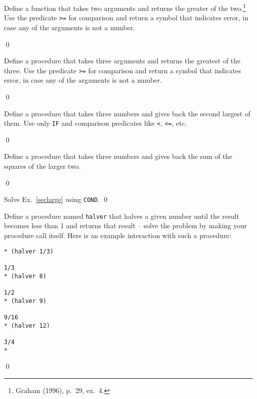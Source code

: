 \documentclass[a4paper,11pt]{article}
\begin{document}
\begin{uexercise}
Define a function that takes two arguments and returns the greater of the two.\footnote{Graham (1996), p.\ 29, ex.\ 4.} Use the predicate \Verb+>=+ for comparison and return a symbol that indicates error, in case any of the arguments is not a number.

\qed
\end{uexercise}

\begin{uexercise}
Define a procedure that takes three arguments and returns the greatest of the three.  Use the predicate \Verb+>=+ for comparison and return a symbol that indicates error, in case any of the arguments is not a number.

\qed
\end{uexercise}

\begin{uexercise}
\label{seclarge}
Define a procedure that takes three numbers and gives back the second largest of them. Use only \Verb+IF+ and comparison predicates like \Verb+<+, \Verb+<=+, etc.

\qed
\end{uexercise}

\begin{uexercise}

Define a procedure that takes three numbers and gives back the sum of the squares of the larger two. 

\qed
\end{uexercise}

\begin{uexercise}
Solve Ex.\ \ref{seclarge} using \Verb+COND+.
\qed
\end{uexercise}

\begin{uexercise}
Define a procedure named \Verb+halver+ that halves a given number until the result becomes less than 1 and returns that result -- solve the problem by making your procedure call itself. Here is an example interaction with such a procedure:

\begin{ucodeframe}
\begin{Verbatim}
* (halver 1/3)

1/3
* (halver 8)

1/2
* (halver 9)

9/16
* (halver 12)

3/4
*
\end{Verbatim}
\end{ucodeframe}

\qed
\end{uexercise}
\end{document}
